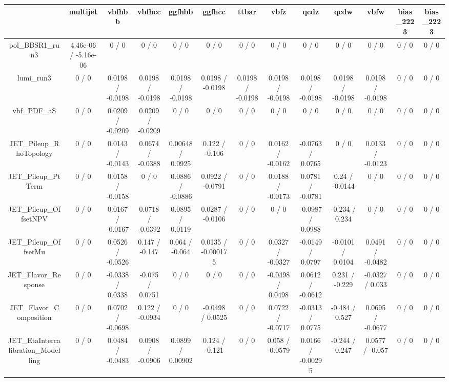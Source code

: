 \documentclass[10pt]{article}
\begin{document}
\begin{table}[htbp]
\begin{center}
\begin{tabular}{|c|c|c|c|c|c|c|c|c|c|c|c|c|}
\hline 
      & multijet      & vbfhbb      & vbfhcc      & ggfhbb      & ggfhcc      & ttbar      & vbfz      & qcdz      & qcdw      & vbfw      & bias_2223      & bias_2223 \\ 
\hline 
  pol_BBSR1_run3 & 4.46e-06 / -5.16e-06 & 0 / 0 & 0 / 0 & 0 / 0 & 0 / 0 & 0 / 0 & 0 / 0 & 0 / 0 & 0 / 0 & 0 / 0 & 0 / 0 & 0 / 0 \\ 
  lumi_run3 & 0 / 0 & 0.0198 / -0.0198 & 0.0198 / -0.0198 & 0.0198 / -0.0198 & 0.0198 / -0.0198 & 0.0198 / -0.0198 & 0.0198 / -0.0198 & 0.0198 / -0.0198 & 0.0198 / -0.0198 & 0.0198 / -0.0198 & 0 / 0 & 0 / 0 \\ 
  vbf_PDF_aS & 0 / 0 & 0.0209 / -0.0209 & 0.0209 / -0.0209 & 0 / 0 & 0 / 0 & 0 / 0 & 0 / 0 & 0 / 0 & 0 / 0 & 0 / 0 & 0 / 0 & 0 / 0 \\ 
  JET_Pileup_RhoTopology & 0 / 0 & 0.0143 / -0.0143 & 0.0674 / -0.0388 & 0.00648 / 0.0925 & 0.122 / -0.106 & 0 / 0 & 0.0162 / -0.0162 & -0.0763 / 0.0765 & 0 / 0 & 0.0133 / -0.0123 & 0 / 0 & 0 / 0 \\ 
  JET_Pileup_PtTerm & 0 / 0 & 0.0158 / -0.0158 & 0 / 0 & 0.0886 / -0.0886 & 0.0922 / -0.0791 & 0 / 0 & 0.0188 / -0.0173 & 0.0781 / -0.0781 & 0.24 / -0.0144 & 0 / 0 & 0 / 0 & 0 / 0 \\ 
  JET_Pileup_OffsetNPV & 0 / 0 & 0.0167 / -0.0167 & 0.0718 / -0.0392 & 0.0895 / 0.0119 & 0.0287 / -0.0106 & 0 / 0 & 0 / 0 & -0.0987 / 0.0988 & -0.234 / 0.234 & 0 / 0 & 0 / 0 & 0 / 0 \\ 
  JET_Pileup_OffsetMu & 0 / 0 & 0.0526 / -0.0526 & 0.147 / -0.147 & 0.064 / -0.064 & 0.0135 / -0.000175 & 0 / 0 & 0.0327 / -0.0327 & -0.0149 / 0.0797 & -0.0101 / 0.0104 & 0.0491 / -0.0482 & 0 / 0 & 0 / 0 \\ 
  JET_Flavor_Response & 0 / 0 & -0.0338 / 0.0338 & -0.075 / 0.0751 & 0 / 0 & 0 / 0 & 0 / 0 & -0.0498 / 0.0498 & 0.0612 / -0.0612 & 0.231 / -0.229 & -0.0327 / 0.033 & 0 / 0 & 0 / 0 \\ 
  JET_Flavor_Composition & 0 / 0 & 0.0702 / -0.0698 & 0.122 / -0.0934 & 0 / 0 & -0.0498 / 0.0525 & 0 / 0 & 0.0722 / -0.0717 & -0.0313 / 0.0775 & -0.484 / 0.527 & 0.0695 / -0.0677 & 0 / 0 & 0 / 0 \\ 
  JET_EtaIntercalibration_Modelling & 0 / 0 & 0.0484 / -0.0483 & 0.0908 / -0.0906 & 0.0899 / 0.00902 & 0.124 / -0.121 & 0 / 0 & 0.058 / -0.0579 & 0.0166 / -0.00295 & -0.244 / 0.247 & 0.0577 / -0.057 & 0 / 0 & 0 / 0 \\ 

\end{tabular}
\end{center}
\end{table}
\end{document}
